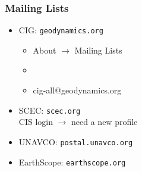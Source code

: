 \documentclass[aspectratio=169]{beamer}
\begin{document}
\begin{frame}
  \frametitle{Mailing Lists}

  \begin{itemize}
  \item CIG: {\tt geodynamics.org}
    \begin{itemize}
    \item About $\rightarrow$ Mailing Lists
    \item {}
    \item cig-all@geodynamics.org
    \end{itemize}
  \item SCEC: {\tt scec.org}\\
    CIS login $\rightarrow$ need a new profile
  \item UNAVCO: {\tt postal.unavco.org}
  \item EarthScope: {\tt earthscope.org}
  \end{itemize}

\end{frame}


\end{document}
